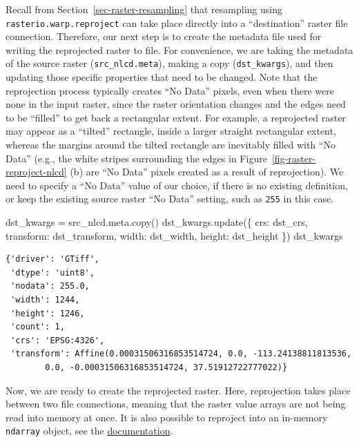 \documentclass[
  letterpaper,
]{krantz}
\newenvironment{Shaded}{\begin{snugshade}}{\end{snugshade}}
\newcommand{\NormalTok}[1]{\textcolor[rgb]{0.00,0.23,0.31}{#1}}
\newcommand{\OperatorTok}[1]{\textcolor[rgb]{0.37,0.37,0.37}{#1}}
\newcommand{\StringTok}[1]{\textcolor[rgb]{0.13,0.47,0.30}{#1}}
\begin{document}
Recall from Section~\ref{sec-raster-resampling} that resampling using
\texttt{rasterio.warp.reproject} can take place directly into a
``destination'' raster file connection. Therefore, our next step is to
create the metadata file used for writing the reprojected raster to
file. For convenience, we are taking the metadata of the source raster
(\texttt{src\_nlcd.meta}), making a copy (\texttt{dst\_kwargs}), and
then updating those specific properties that need to be changed. Note
that the reprojection process typically creates ``No Data'' pixels, even
when there were none in the input raster, since the raster orientation
changes and the edges need to be ``filled'' to get back a rectangular
extent. For example, a reprojected raster may appear as a ``tilted''
rectangle, inside a larger straight rectangular extent, whereas the
margins around the tilted rectangle are inevitably filled with ``No
Data'' (e.g., the white stripes surrounding the edges in
Figure~\ref{fig-raster-reproject-nlcd} (b) are ``No Data'' pixels
created as a result of reprojection). We need to specify a ``No Data''
value of our choice, if there is no existing definition, or keep the
existing source raster ``No Data'' setting, such as \texttt{255} in this
case.

\begin{Shaded}
\begin{Highlighting}[]
\NormalTok{dst\_kwargs }\OperatorTok{=}\NormalTok{ src\_nlcd.meta.copy()}
\NormalTok{dst\_kwargs.update(\{}
    \StringTok{\textquotesingle{}crs\textquotesingle{}}\NormalTok{: dst\_crs,}
    \StringTok{\textquotesingle{}transform\textquotesingle{}}\NormalTok{: dst\_transform,}
    \StringTok{\textquotesingle{}width\textquotesingle{}}\NormalTok{: dst\_width,}
    \StringTok{\textquotesingle{}height\textquotesingle{}}\NormalTok{: dst\_height}
\NormalTok{\})}
\NormalTok{dst\_kwargs}
\end{Highlighting}
\end{Shaded}

\begin{verbatim}
{'driver': 'GTiff',
 'dtype': 'uint8',
 'nodata': 255.0,
 'width': 1244,
 'height': 1246,
 'count': 1,
 'crs': 'EPSG:4326',
 'transform': Affine(0.00031506316853514724, 0.0, -113.24138811813536,
        0.0, -0.00031506316853514724, 37.51912722777022)}
\end{verbatim}

Now, we are ready to create the reprojected raster. Here, reprojection
takes place between two file connections, meaning that the raster value
arrays are not being read into memory at once. It is also possible to
reproject into an in-memory \texttt{ndarray} object, see the
\href{https://rasterio.readthedocs.io/en/latest/api/rasterio.warp.html\#rasterio.warp.reproject}{documentation}.
\end{document}
